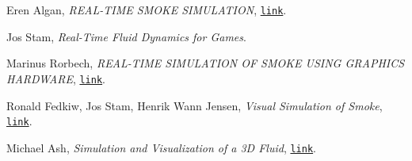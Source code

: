 \documentclass[a4paper,12pt]{article}
\begin{document}
	
	\pagebreak
	\begin{thebibliography}{15}
	
		Eren Algan, \textit{REAL-TIME SMOKE SIMULATION},
		\texttt{\href{http://repository.bilkent.edu.tr/bitstream/handle/11693/15609/0006332.pdf?sequence=1&isAllowed=y}{link}}.
		
		Jos Stam, \textit{Real-Time Fluid Dynamics for Games}.
		
		Marinus Rorbech, \textit{REAL-TIME SIMULATION OF SMOKE USING GRAPHICS HARDWARE},
		\texttt{\href{http://image.diku.dk/projects/media/roerbech.04.pdf}{link}}.
		
		Ronald Fedkiw, Jos Stam, Henrik Wann Jensen, \textit{Visual Simulation of Smoke},
		\texttt{\href{http://graphics.ucsd.edu/~henrik/papers/smoke/smoke.pdf}{link}}.
		
		Michael Ash, \textit{Simulation and Visualization of a 3D Fluid},
		\texttt{\href{https://www.mikeash.com/thesis/thesis-en.pdf}{link}}.
		
	\end{thebibliography}
	
\end{document}
